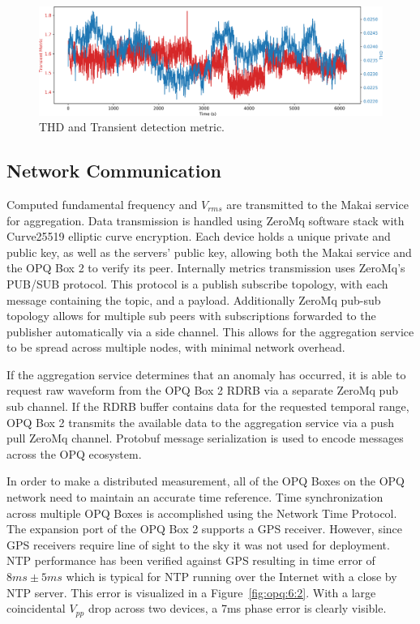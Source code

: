 \begin{figure}[h]
	\begin{center}
		\includegraphics[width=1\textwidth]{img/trans_thd_det.pdf}
	\end{center}
	\caption{THD and Transient detection metric.}
	\label{fig:opq:9}
\end{figure}

\subsection{Network Communication}\label{subsec:network-communication}

Computed fundamental frequency and $V_{rms}$ are transmitted to the Makai service for aggregation.
Data transmission is handled using ZeroMq software stack with Curve25519 elliptic curve encryption.
Each device holds a unique private and public key, as well as the servers' public key, allowing both the Makai service and the OPQ Box 2 to verify its peer.
Internally metrics transmission uses ZeroMq's PUB/SUB protocol.
This protocol is a publish subscribe topology, with each message containing the topic, and a payload.
Additionally ZeroMq pub-sub topology allows for multiple sub peers with subscriptions forwarded to the publisher automatically via a side channel.
This allows for the aggregation service to be spread across multiple nodes, with minimal network overhead.

If the aggregation service determines that an anomaly has occurred, it is able to request raw waveform from the OPQ Box 2 RDRB via a separate ZeroMq pub sub channel.
If the RDRB buffer contains data for the requested temporal range, OPQ Box 2 transmits the available data to the aggregation service via a push pull ZeroMq channel.
Protobuf message serialization is used to encode messages across the OPQ ecosystem.


In order to make a distributed measurement, all of the OPQ Boxes on the OPQ network need to maintain an accurate time reference.
Time synchronization across multiple OPQ Boxes is accomplished using the Network Time Protocol.
The expansion port of the OPQ Box 2 supports a GPS receiver.
However, since GPS receivers require line of sight to the sky it was not used for deployment.
NTP performance has been verified against GPS resulting in time error of $8ms\pm 5ms$ which is typical for NTP running over the Internet with a close by NTP server.
This error is visualized in a Figure~\ref{fig:opq:6:2}.
With a large coincidental $V_{pp}$ drop across two devices, a 7ms phase error is clearly visible.


